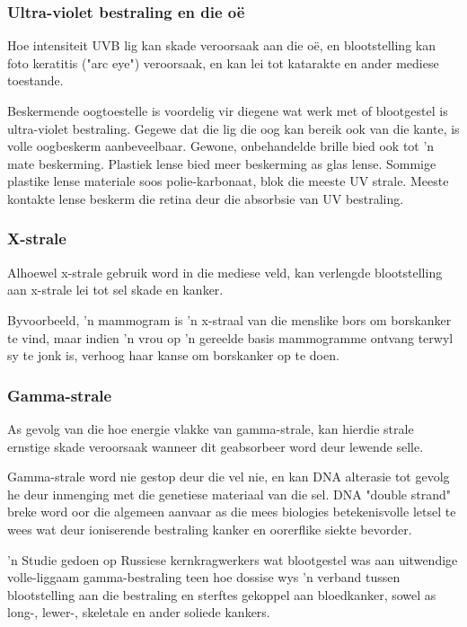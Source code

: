             \subsubsection*{Ultra-violet bestraling en die o\"e}
            \nopagebreak
        \label{m38779*id189581}Hoe intensiteit UVB lig kan skade veroorsaak aan die o\"e, en blootstelling kan foto keratitis ("arc eye") veroorsaak, en kan lei tot katarakte en ander mediese toestande. \par 
        \label{m38779*id189586}Beskermende oogtoestelle is voordelig vir diegene wat werk met of blootgestel is ultra-violet bestraling. Gegewe dat die lig die oog kan bereik ook van die kante, is volle oogbeskerm aanbeveelbaar. 
        \label{m38779*id189594} Gewone, onbehandelde brille bied ook tot 'n mate beskerming. Plastiek lense bied meer beskerming as glas lense. Sommige plastike lense materiale soos polie-karbonaat, blok die meeste UV strale. Meeste kontakte lense beskerm die retina deur die absorbsie van UV bestraling. \par 
      \label{m38779*uid22}
      \begin{minipage}{.5\textwidth}
            \subsubsection*{X-strale}
            \nopagebreak
        \label{m38779*id189613}Alhoewel x-strale gebruik word in die mediese veld, kan verlengde blootstelling aan x-strale lei tot sel skade en kanker. \par 
        \label{m38779*id189617} Byvoorbeeld, 'n mammogram is 'n x-straal van die menslike bors om borskanker te vind, maar indien 'n vrou op 'n gereelde basis mammogramme ontvang terwyl sy te jonk is, verhoog haar kanse om borskanker op te doen. \par 
      \label{m38779*uid23}
            \subsubsection*{Gamma-strale}
            \nopagebreak
        \label{m38779*id189632}As gevolg van die hoe energie vlakke van gamma-strale, kan hierdie strale ernstige skade veroorsaak wanneer dit geabsorbeer word deur lewende selle. \par 
        \label{m38779*id189636}Gamma-strale word nie gestop deur die vel nie, en kan DNA alterasie tot gevolg he deur inmenging met die genetiese materiaal van die sel. DNA "double strand" breke word oor die algemeen aanvaar as die mees biologies betekenisvolle letsel te wees wat deur ioniserende bestraling kanker en oorerflike siekte bevorder. \par 
        \label{m38779*id189642} 'n Studie gedoen op Russiese kernkragwerkers wat blootgestel was aan uitwendige volle-liggaam gamma-bestraling teen hoe dossise wys 'n verband tussen blootstelling aan die bestraling en sterftes gekoppel aan bloedkanker, sowel as long-, lewer-, skeletale en ander soliede kankers. \par 
      \label{m38779*eip-665}
\end{minipage}
